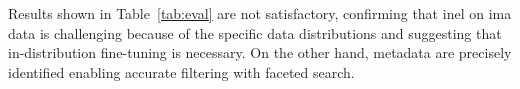 


Results shown in Table~\ref{tab:eval} are not satisfactory, confirming that \ac{inel} on \ac{ima} data is challenging because of the specific data distributions and suggesting that in-distribution fine-tuning is necessary.
On the other hand, metadata are precisely identified enabling accurate filtering with faceted search.


